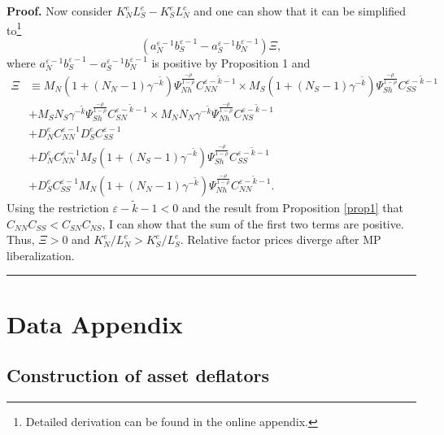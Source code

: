 \documentclass[notitlepage,11pt]{article}%
\newenvironment{proof}[1][Proof]{\noindent \textbf{#1.} }{\  \rule{0.5em}{0.5em}}
\begin{document}
\begin{proof}
Now consider $K_{N}^{e}L_{S}^{e}-K_{S}^{e}L_{N}^{e}$ and one can show that it
can be simplified to\footnote{Detailed derivation can be found in the online
appendix.}%
\[
\left(  a_{N}^{\varepsilon-1}b_{S}^{\varepsilon-1}-a_{S}^{\varepsilon-1}%
b_{N}^{\varepsilon-1}\right)  \Xi,
\]
where $a_{N}^{\varepsilon-1}b_{S}^{\varepsilon-1}-a_{S}^{\varepsilon-1}%
b_{N}^{\varepsilon-1}$ is positive by Proposition 1 and
\begin{align*}
\Xi &  \equiv M_{N}\left(  1+\left(  N_{N}-1\right)  \gamma^{-\tilde{k}%
}\right)  \Psi_{Nh}^{\frac{-\rho}{1-\rho}}C_{NN}^{\varepsilon-\tilde{k}%
-1}\times M_{S}\left(  1+\left(  N_{S}-1\right)  \gamma^{-\tilde{k}}\right)
\Psi_{Sh}^{\frac{-\rho}{1-\rho}}C_{SS}^{\varepsilon-\tilde{k}-1}\\
&  +M_{S}N_{S}\gamma^{-\tilde{k}}\Psi_{Sh}^{\frac{-\rho}{1-\rho}}%
C_{SN}^{\varepsilon-\tilde{k}-1}\times M_{N}N_{N}\gamma^{-\tilde{k}}\Psi
_{Nh}^{\frac{-\rho}{1-\rho}}C_{NS}^{\varepsilon-\tilde{k}-1}\\
&  +D_{N}^{e}C_{NN}^{\varepsilon-1}D_{S}^{e}C_{SS}^{\varepsilon-1}\\
&  +D_{N}^{e}C_{NN}^{\varepsilon-1}M_{S}\left(  1+\left(  N_{S}-1\right)
\gamma^{-\tilde{k}}\right)  \Psi_{Sh}^{\frac{-\rho}{1-\rho}}C_{SS}%
^{\varepsilon-\tilde{k}-1}\\
&  +D_{S}^{e}C_{SS}^{\varepsilon-1}M_{N}\left(  1+\left(  N_{N}-1\right)
\gamma^{-\tilde{k}}\right)  \Psi_{Nh}^{\frac{-\rho}{1-\rho}}C_{NN}%
^{\varepsilon-\tilde{k}-1}.
\end{align*}
Using the restriction $\varepsilon-\tilde{k}-1<0$ and the result from
Proposition \ref{prop1} that $C_{NN}C_{SS}<C_{SN}C_{NS}$, I can show that the
sum of the first two terms are positive. Thus, $\Xi>0$ and $K_{N}^{e}%
/L_{N}^{e}>K_{S}^{e}/L_{S}^{e}$. Relative factor prices diverge after MP liberalization.
\end{proof}

\section{Data Appendix}

\subsection{Construction of asset deflators}
\end{document}

